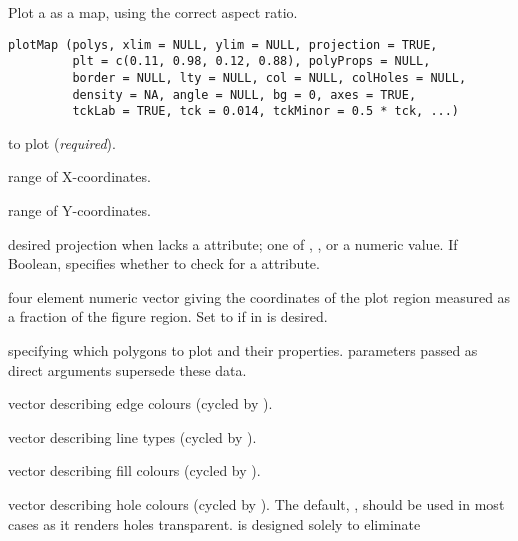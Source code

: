 \documentclass[letterpaper]{book}
\begin{document}
%
\begin{Description}\relax
Plot a  as a map, using the correct aspect ratio.
\end{Description}
%
\begin{Usage}
\begin{verbatim}
plotMap (polys, xlim = NULL, ylim = NULL, projection = TRUE,
         plt = c(0.11, 0.98, 0.12, 0.88), polyProps = NULL,
         border = NULL, lty = NULL, col = NULL, colHoles = NULL,
         density = NA, angle = NULL, bg = 0, axes = TRUE,
         tckLab = TRUE, tck = 0.014, tckMinor = 0.5 * tck, ...)
\end{verbatim}
\end{Usage}
%
\begin{Arguments}
\begin{ldescription}
\item[\code{polys}]  to plot (\emph{required}).
\item[\code{xlim}] range of X-coordinates.
\item[\code{ylim}] range of Y-coordinates.
\item[\code{projection}] desired projection when  lacks a
 attribute; one of , ,
or a numeric value.  If Boolean, specifies whether to check
 for a  attribute.
\item[\code{plt}] four element numeric vector  giving
the coordinates of the plot region measured as a fraction of the
figure region. Set to  if  in  is
desired.
\item[\code{polyProps}]  specifying which polygons to plot and their
properties.   parameters passed as direct arguments
supersede these data.
\item[\code{border}] vector describing edge colours (cycled by ).
\item[\code{lty}] vector describing line types (cycled by ).
\item[\code{col}] vector describing fill colours (cycled by ).
\item[\code{colHoles}] vector describing hole colours (cycled by ).
The default, , should be used in most cases as it renders
holes transparent.  is designed solely to eliminate

\end{ldescription}
\end{Arguments}
\end{document}
